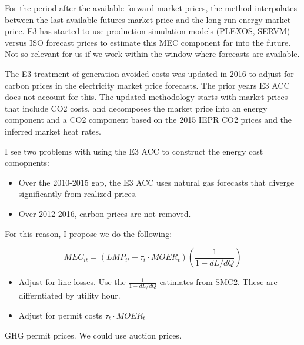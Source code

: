 \documentclass[11pt]{article}
\begin{document}
\bigskip

For the period after the available forward market prices, the method interpolates between the last available futures market price and the long-run energy market price.  E3 has started to use production simulation models (PLEXOS, SERVM) versus ISO forecast prices to estimate this MEC component far into the future. Not so relevant for us if we  work within the window where forecasts are available. 

\bigskip
	
The E3 treatment of generation avoided costs was updated in 2016 to adjust for carbon prices in the electricity market price forecasts. The prior years E3 ACC does not account for this. The updated methodology starts with market prices that include CO2 costs, and decomposes the market price into an energy component and a CO2 component based on the 2015 IEPR CO2 prices and the inferred market heat rates.


\bigskip

I see two problems with using the E3 ACC to construct the energy cost comopnents:

\begin{itemize}
\item  Over the 2010-2015 gap, the E3 ACC uses natural gas forecasts that diverge significantly from realized prices. 
\item  Over 2012-2016, carbon prices are not removed.

\end{itemize}

For this reason, I propose we do the following:

\begin{center}
\begin{equation*}
MEC_{it} = (LMP_{it}-\tau_t \cdot MOER_t )(\frac{1}{1-dL/dQ} )
\end{equation*}
\end{center}

\begin{itemize}

\item Adjust for line losses. Use the $\frac{1}{1-dL/dQ}$ estimates from SMC2. These are differntiated by utility hour. 
\item Adjust for permit costs $\tau_t  \cdot MOER_t$

\end{itemize}

GHG permit prices. We could use auction prices. 
\end{document}
